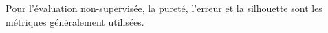  Pour l'évaluation non-supervisée, la pureté, l'erreur et la silhouette sont les métriques généralement utilisées.







